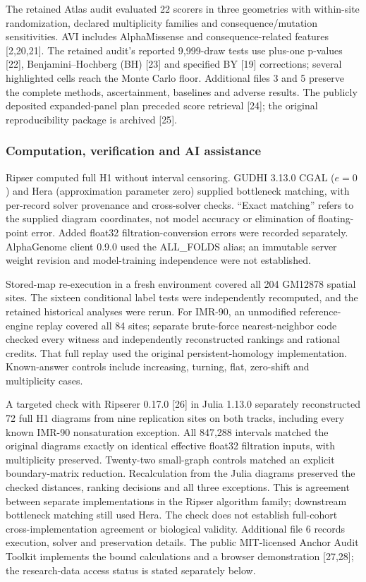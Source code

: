 \documentclass[
  11pt,
]{article}
\begin{document}
The retained Atlas audit evaluated 22 scorers in three geometries with
within-site randomization, declared multiplicity families and
consequence/mutation sensitivities. AVI includes AlphaMissense and
consequence-related features {[}2,20,21{]}. The retained audit's
reported 9,999-draw tests use plus-one p-values {[}22{]},
Benjamini--Hochberg (BH) {[}23{]} and specified BY {[}19{]} corrections;
several highlighted cells reach the Monte Carlo floor. Additional files
3 and 5 preserve the complete methods, ascertainment, baselines and
adverse results. The publicly deposited expanded-panel plan preceded
score retrieval {[}24{]}; the original reproducibility package is
archived {[}25{]}.

\subsubsection{Computation, verification and AI
assistance}\label{computation-verification-and-ai-assistance}

Ripser computed full H1 without interval censoring. GUDHI 3.13.0 CGAL
(\(e=0\)) and Hera (approximation parameter zero) supplied bottleneck
matching, with per-record solver provenance and cross-solver checks.
``Exact matching'' refers to the supplied diagram coordinates, not model
accuracy or elimination of floating-point error. Added float32
filtration-conversion errors were recorded separately. AlphaGenome
client 0.9.0 used the ALL\_FOLDS alias; an immutable server weight
revision and model-training independence were not established.

Stored-map re-execution in a fresh environment covered all 204 GM12878
spatial sites. The sixteen conditional label tests were independently
recomputed, and the retained historical analyses were rerun. For IMR-90,
an unmodified reference-engine replay covered all 84 sites; separate
brute-force nearest-neighbor code checked every witness and
independently reconstructed rankings and rational credits. That full
replay used the original persistent-homology implementation.
Known-answer controls include increasing, turning, flat, zero-shift and
multiplicity cases.

A targeted check with Ripserer 0.17.0 {[}26{]} in Julia 1.13.0
separately reconstructed 72 full H1 diagrams from nine replication sites
on both tracks, including every known IMR-90 nonsaturation exception.
All 847,288 intervals matched the original diagrams exactly on identical
effective float32 filtration inputs, with multiplicity preserved.
Twenty-two small-graph controls matched an explicit boundary-matrix
reduction. Recalculation from the Julia diagrams preserved the checked
distances, ranking decisions and all three exceptions. This is agreement
between separate implementations in the Ripser algorithm family;
downstream bottleneck matching still used Hera. The check does not
establish full-cohort cross-implementation agreement or biological
validity. Additional file 6 records execution, solver and preservation
details. The public MIT-licensed Anchor Audit Toolkit implements the
bound calculations and a browser demonstration {[}27,28{]}; the
research-data access status is stated separately below.
\end{document}
